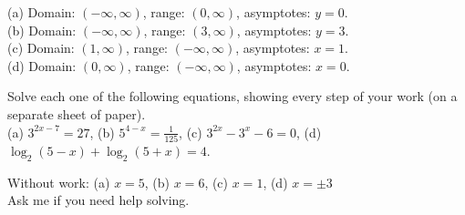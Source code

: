 \documentclass[11pt]{exam}
\begin{document}
\begin{questions}
\begin{solution}
(a) Domain: \((-\infty,\infty)\), range: \((0,\infty)\), asymptotes:
 \(y=0\).\\
(b) Domain: \((-\infty, \infty)\), range: \((3,\infty)\), asymptotes:
\(y=3\).\\
(c) Domain: \((1,\infty)\), range: \((-\infty,\infty)\), asymptotes:
\(x=1\).\\
(d) Domain: \((0,\infty)\), range: \((-\infty,\infty)\), asymptotes: \(x=0\).
    \end{solution}
    \vspace{0.2in}
    \question Solve each one of the following equations, showing every
    step of your work (on a separate sheet of paper).\\
    (a) \(3^{2x-7} = 27\), (b) \(5^{4-x} = \frac{1}{125}\), (c)
    \(3^{2x}-3^x-6 = 0\), (d) \(\log_2(5-x) + \log_2(5+x) = 4\).
    \end{questions}
    \begin{solution}
      Without work:
      (a) \(x=5\), (b) \(x=6\), (c) \(x=1\), (d) \(x = \pm 3\)\\
      Ask me if you need help solving.
    \end{solution}
  
\end{document}
